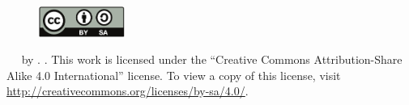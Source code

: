 \vfill

\begin{figure}[!h]
	\begin{center}
		\includegraphics[width=0.25\textwidth]{figures/by-sa-logo.pdf}
	\end{center}
\end{figure}

\textcopyright\  \YEAR~ by \printlab. \printtitle. This work is licensed under the ``Creative Commons Attribution-Share Alike 4.0 International'' license. To view a copy of this license, visit \href{http://creativecommons.org/licenses/by-sa/4.0/}{http://creativecommons.org/licenses/by-sa/4.0/}.
